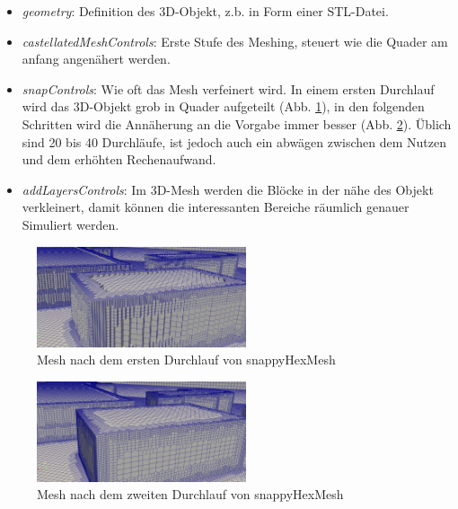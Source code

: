 \begin{itemize}
    \item \textit{geometry}: Definition des 3D-Objekt, z.b. in Form einer STL-Datei.
    \item \textit{castellatedMeshControls}: Erste Stufe des Meshing, steuert wie die Quader am anfang angenähert werden.
    \item \textit{snapControls}: Wie oft das Mesh verfeinert wird. 
    In einem ersten Durchlauf wird das 3D-Objekt grob in Quader aufgeteilt (Abb. \ref{fig:snappygrobbild}),
    in den folgenden Schritten wird die Annäherung an die Vorgabe immer besser (Abb. \ref{fig:snappyfeinbild}).
    Üblich sind 20 bis 40 Durchläufe, ist jedoch auch ein abwägen zwischen dem Nutzen und dem erhöhten Rechenaufwand.
    \item \textit{addLayersControls}: Im 3D-Mesh werden die Blöcke in der nähe des Objekt verkleinert, 
    damit können die interessanten Bereiche räumlich genauer Simuliert werden.
\end{itemize}

\begin{figure}
    \centering
    \includegraphics[width=0.55\textwidth]{papers/openfoam/Bilder/Snappy_grob.png}
    \caption{Mesh nach dem ersten Durchlauf von snappyHexMesh}
    \label{fig:snappygrobbild}
\end{figure}

\begin{figure}
    \centering
    \includegraphics[width=0.55\textwidth]{papers/openfoam/Bilder/Snappy_fein.png}
    \caption{Mesh nach dem zweiten Durchlauf von snappyHexMesh}
    \label{fig:snappyfeinbild}
\end{figure}

